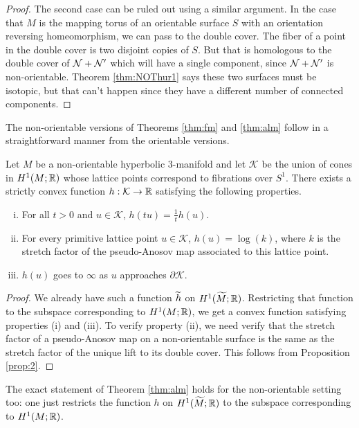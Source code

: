 \begin{proof}
  The second case can be ruled out using a similar argument. In the case that $M$ is the mapping
  torus of an orientable surface $S$ with an orientation reversing homeomorphism, we can pass to
  the double cover. The fiber of a point in the double cover is two disjoint copies of $S$. But
  that is homologous to the double cover of $\mathcal{N} + \mathcal{N}'$ which will have a single component, since
  $\mathcal{N} + \mathcal{N}'$ is non-orientable. Theorem \ref{thm:NOThur1} says these two surfaces must be
  isotopic, but that can't happen since they have a different number of connected components.
\end{proof}

The non-orientable versions of Theorems \ref{thm:fm} and \ref{thm:alm} follow in a straightforward
manner from the orientable versions.

\begin{thm}
  \label{thm:NOfm}
  Let $M$ be a non-orientable hyperbolic $3$-manifold and let $\mathcal{K}$ be the union of cones
  in $H^1(M; \mathbb{R})$ whose lattice points correspond to fibrations over $S^1$. There exists a
  strictly convex function $h: \mathcal{K} \to \mathbb{R}$ satisfying the following properties.
  \begin{enumerate}[(i)]
  \item For all $t > 0$ and $u \in \mathcal{K}$, $h(tu) = \frac{1}{t} h(u)$.
  \item For every primitive lattice point $u \in \mathcal{K}$, $h(u) = \log(k)$, where $k$ is
    the stretch factor of the pseudo-Anosov map associated to this lattice point.
  \item $h(u)$ goes to $\infty$ as $u$ approaches $\partial \mathcal{K}$.
  \end{enumerate}
\end{thm}

\begin{proof}
  We already have such a function $\widetilde{h}$ on $H^1(\widetilde{M}; \mathbb{R})$. Restricting that function
  to the subspace corresponding to $H^1(M; \mathbb{R})$, we get a convex function satisfying properties
  (i) and (iii). To verify property (ii), we need verify that the stretch factor of a pseudo-Anosov
  map on a non-orientable surface is the same as the stretch factor of the unique lift to its
  double cover. This follows from Proposition \ref{prop:2}.
\end{proof}

The exact statement of Theorem \ref{thm:alm} holds for the non-orientable setting too: one just
restricts the function $h$ on $H^1(\widetilde{M}; \mathbb{R})$ to the subspace corresponding to $H^1(M; \mathbb{R})$.